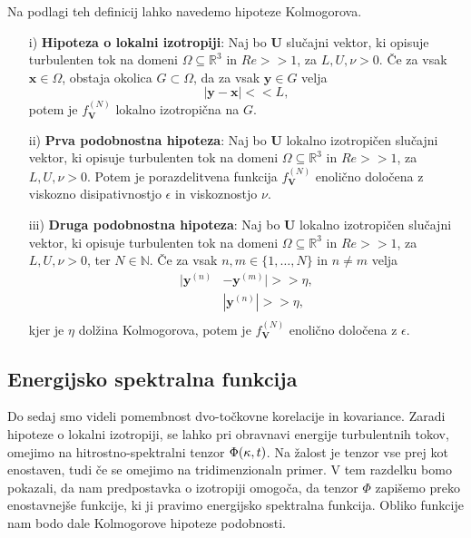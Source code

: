 \documentclass[mat2, tisk]{fmfdelo}
\newcommand{\R}{\mathbb R}
\newcommand{\N}{\mathbb N}
\newcommand{\bd}{\textbf}
\begin{document}
Na podlagi teh definicij lahko navedemo hipoteze Kolmogorova.

\begin{enumerate}
  \item[i)] \textbf{Hipoteza o lokalni izotropiji}: Naj bo $\bd{U}$ slučajni vektor,
  ki opisuje turbulenten tok na domeni $\Omega \subseteq \R^3$ in $Re >\!\!> 1$, za $L, U, \nu > 0$. Če 
  za vsak $\bd{x}\in \Omega$, obstaja okolica $G \subset \Omega$, da za vsak 
  $\bd{y}\in G$ velja $$ |\bd{y} - \bd{x}| <\!\!< L,$$ potem je $f_\bd{V}^{(N)}$ lokalno 
  izotropična na $G$.
  \item[ii)] \textbf{Prva podobnostna hipoteza}: Naj bo $\bd{U}$ lokalno izotropičen slučajni vektor,
  ki opisuje turbulenten tok na domeni $\Omega \subseteq \R^3$ in $Re >\!\!> 1$, za $L, U, \nu > 0$.
  Potem je porazdelitvena funkcija $f_\bd{V}^{(N)}$ enolično določena 
  z viskozno disipativnostjo $\epsilon$ in viskoznostjo $\nu$.
  \item[iii)] \textbf{Druga podobnostna hipoteza}: Naj bo $\bd{U}$ lokalno izotropičen slučajni vektor,
  ki opisuje turbulenten tok na domeni $\Omega \subseteq \R^3$ in $Re >\!\!> 1$, za $L, U, \nu > 0$, ter $N\in \N$.
  Če za vsak $n, m \in \{1, \dots, N\}$ in $n\neq m$ velja 
  \begin{align*}
  |\bd{y}^{(n)} &- \bd{y}^{(m)}| >\!\!> \eta,\\
  &|\bd{y}^{(n)}|>\!\!> \eta, \\
\end{align*}
kjer je $\eta$ dolžina  Kolmogorova, potem je $f_\bd{V}^{(N)}$ enolično 
določena z $\epsilon$.
\end{enumerate}

\subsection{Energijsko spektralna funkcija}

Do sedaj smo videli pomembnost dvo-točkovne korelacije in kovariance. 
Zaradi hipoteze o lokalni izotropiji, se lahko pri obravnavi 
energije turbulentnih tokov, omejimo na hitrostno-spektralni tenzor $\Phi(\text{\bd{$\kappa$}}, t)$. 
Na žalost je tenzor vse prej kot enostaven, tudi če se omejimo na  tridimenzionaln primer. V tem razdelku bomo pokazali, 
da nam predpostavka o izotropiji omogoča, da tenzor $\Phi$ zapišemo 
preko enostavnejše funkcije, ki ji pravimo energijsko spektralna funkcija.
Obliko funkcije nam bodo dale Kolmogorove hipoteze podobnosti. 
\end{document}
